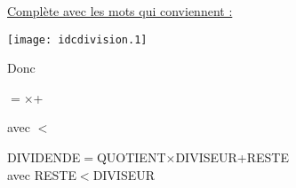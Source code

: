 \underline {Complète avec les mots qui conviennent :}\par
\begin{minipage}[l]{10cm}
\begin{center}
\texttt{[image: idcdivision.1]}
\end{center}
\end{minipage}
\begin{minipage}[r]{9cm}
\qquad Donc
\begin{center}
\dotfill$=$\dotfill$\times$\dotfill+\dotfill
\par
avec \dotfill$<$\dotfill
\end{center}
\end{minipage}
DIVIDENDE$=$QUOTIENT$\times$DIVISEUR+RESTE \\[.5cm]
avec RESTE$<$DIVISEUR